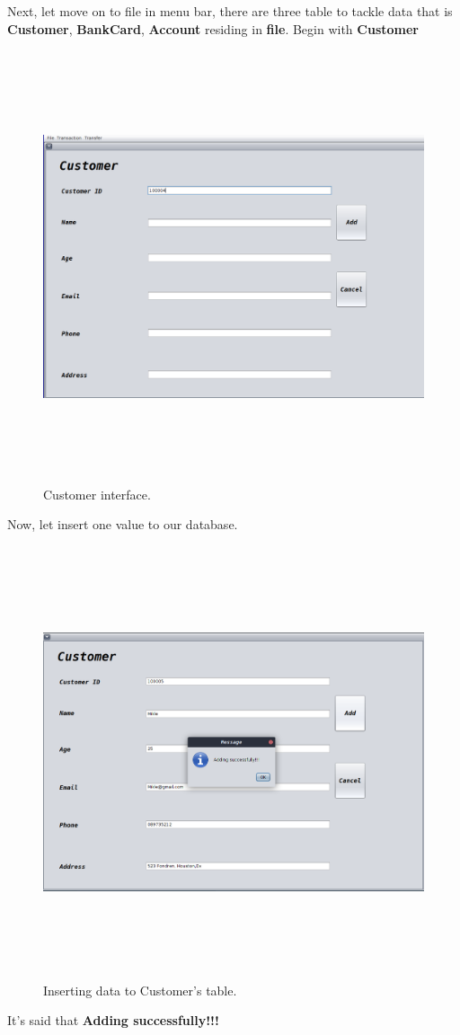 \documentclass[12pt,a4paper]{article}
\begin{document}
\indent Next, let move on to file in menu bar, there are three table to tackle data that is \textbf{Customer}, \textbf{BankCard}, \textbf{Account} residing in \textbf{file}. Begin with \textbf{Customer}
 \begin{figure}[H]
        \centering
        \includegraphics[width=5.5in,height=5in]{Picture/app2.png}
        \caption{Customer interface.}
    \end{figure}

\newpage
\indent Now, let insert one value to our database.

    \begin{figure}[H]
        \centering
        \includegraphics[width=5.5in,height=5in]{Picture/insertCus1.png}
        \caption{Inserting data to Customer's table.}
    \end{figure}
\indent It's said that \textbf{Adding successfully!!!}
\end{document}
